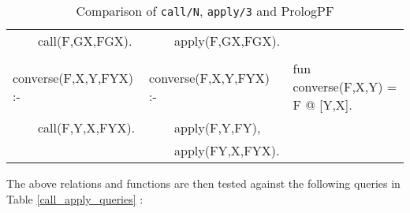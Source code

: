\begin{table}[htbp]
{\begin{tabular}{| l | l | l |}
~~~~call(F,GX,FGX).        &~~~~apply(F,GX,FGX).       & \\
& & \\
converse(F,X,Y,FYX) :-     &converse(F,X,Y,FYX) :-     &fun converse(F,X,Y) = F @ [Y,X]. \\
~~~~call(F,Y,X,FYX).       &~~~~apply(F,Y,FY),         &\\
                           &~~~~apply(FY,X,FYX).       &\\
\hline
\end{tabular}
}
\caption{Comparison of \texttt{call/N}, \texttt{apply/3} and PrologPF}
\label{call_apply}
\end{table}

The above relations and functions are then tested against the following
queries in Table \ref{call_apply_queries} \cite{Nai96}:

